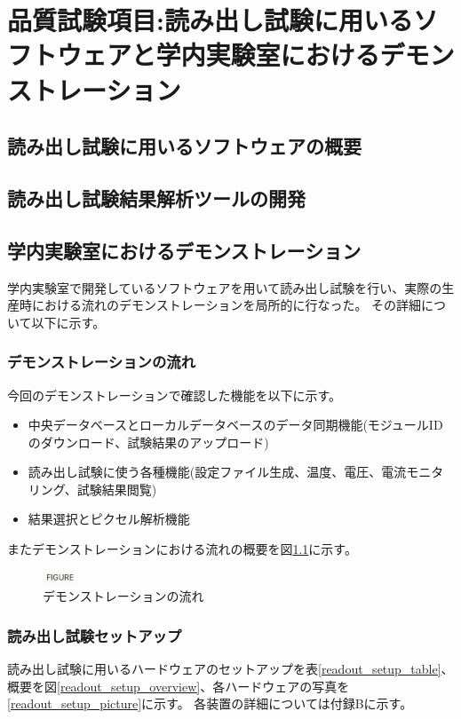 \chapter{品質試験項目:読み出し試験に用いるソフトウェアと学内実験室におけるデモンストレーション}

\section{読み出し試験に用いるソフトウェアの概要}

\section{読み出し試験結果解析ツールの開発}

\section{学内実験室におけるデモンストレーション}
学内実験室で開発しているソフトウェアを用いて読み出し試験を行い、実際の生産時における流れのデモンストレーションを局所的に行なった。
その詳細について以下に示す。

\subsection{デモンストレーションの流れ}

今回のデモンストレーションで確認した機能を以下に示す。
\begin{itemize}
  \item 中央データベースとローカルデータベースのデータ同期機能(モジュールIDのダウンロード、試験結果のアップロード)
  \item 読み出し試験に使う各種機能(設定ファイル生成、温度、電圧、電流モニタリング、試験結果閲覧)
  \item 結果選択とピクセル解析機能
\end{itemize}

またデモンストレーションにおける流れの概要を図\ref{demo_flow}に示す。

\begin{figure}[bpt]\centering
\includegraphics[width=1cm]{figure}
\caption[デモンストレーションの流れ]{デモンストレーションの流れ}
\label{demo_flow}
\end{figure}

\subsection{読み出し試験セットアップ}
読み出し試験に用いるハードウェアのセットアップを表\ref{readout_setup_table}、概要を図\ref{readout_setup_overview}、各ハードウェアの写真を\ref{readout_setup_picture}に示す。
各装置の詳細については付録Bに示す。

